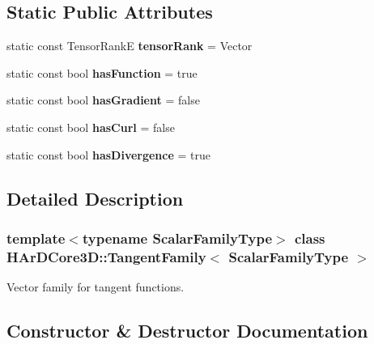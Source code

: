 \subsection*{Static Public Attributes}
\begin{DoxyCompactItemize}
\item 
\mbox{\label{classHArDCore3D_1_1TangentFamily_addb414802c3ee0841738affdf7518d76}} 
static const Tensor\+RankE {\bfseries tensor\+Rank} = Vector
\item 
\mbox{\label{classHArDCore3D_1_1TangentFamily_ad4ab1d6b2ca463c599a0cc2aa3bee0a0}} 
static const bool {\bfseries has\+Function} = true
\item 
\mbox{\label{classHArDCore3D_1_1TangentFamily_a24a08dabc84df4bad4a01bd0dacf65ee}} 
static const bool {\bfseries has\+Gradient} = false
\item 
\mbox{\label{classHArDCore3D_1_1TangentFamily_ad060c626292c8768ac2d07e2a502843a}} 
static const bool {\bfseries has\+Curl} = false
\item 
\mbox{\label{classHArDCore3D_1_1TangentFamily_acc4ac75108de64702c0f59737f1b5173}} 
static const bool {\bfseries has\+Divergence} = true
\end{DoxyCompactItemize}


\subsection{Detailed Description}
\subsubsection*{template$<$typename Scalar\+Family\+Type$>$\newline
class H\+Ar\+D\+Core3\+D\+::\+Tangent\+Family$<$ Scalar\+Family\+Type $>$}

Vector family for tangent functions. 

\subsection{Constructor \& Destructor Documentation}
\mbox{\label{classHArDCore3D_1_1TangentFamily_adf75daa62a416097ab9c2ec133dd3553}} 
